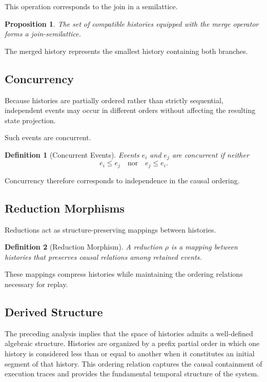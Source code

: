 \documentclass[12pt]{article}
\newtheorem{definition}{Definition}
\newtheorem{proposition}{Proposition}
\begin{document}
This operation corresponds to the join in a
semilattice.

\begin{proposition}
The set of compatible histories equipped with
the merge operator forms a join-semilattice.
\end{proposition}

The merged history represents the smallest
history containing both branches.

\subsection{Concurrency}

Because histories are partially ordered rather
than strictly sequential, independent events
may occur in different orders without affecting
the resulting state projection.

Such events are concurrent.

\begin{definition}[Concurrent Events]
Events $e_i$ and $e_j$ are concurrent if neither
\[
e_i \leq e_j
\quad \text{nor} \quad
e_j \leq e_i.
\]
\end{definition}

Concurrency therefore corresponds to independence
in the causal ordering.

\subsection{Reduction Morphisms}

Reductions act as structure-preserving mappings
between histories.

\begin{definition}[Reduction Morphism]
A reduction $\rho$ is a mapping between histories
that preserves causal relations among retained
events.
\end{definition}

These mappings compress histories while maintaining
the ordering relations necessary for replay.

\subsection{Derived Structure}

The preceding analysis implies that the space of histories
admits a well-defined algebraic structure. Histories are
organized by a prefix partial order in which one history
is considered less than or equal to another when it
constitutes an initial segment of that history. This
ordering relation captures the causal containment of
execution traces and provides the fundamental temporal
structure of the system.
\end{document}
